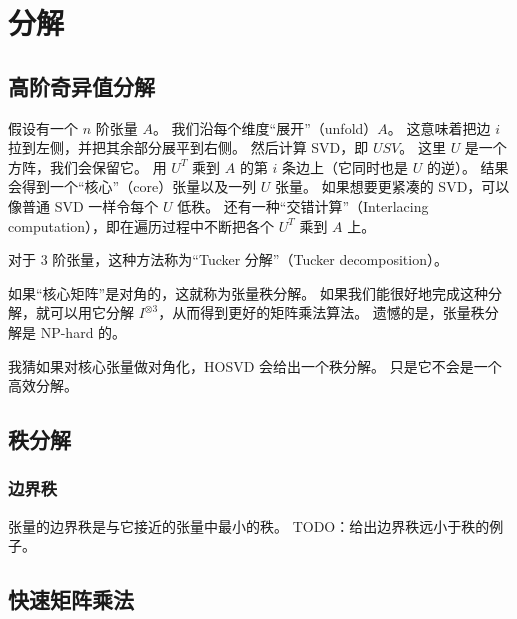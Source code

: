 
\chapter{分解}


\section{高阶奇异值分解}
\label{sec:HOSVD}
假设有一个 $n$ 阶张量 $A$。
我们沿每个维度“展开”（unfold）$A$。
这意味着把边 $i$ 拉到左侧，并把其余部分展平到右侧。
然后计算 SVD，即 $USV$。
这里 $U$ 是一个方阵，我们会保留它。
用 $U^T$ 乘到 $A$ 的第 $i$ 条边上（它同时也是 $U$ 的逆）。
结果会得到一个“核心”（core）张量以及一列 $U$ 张量。
如果想要更紧凑的 SVD，可以像普通 SVD 一样令每个 $U$ 低秩。
还有一种“交错计算”（Interlacing computation），即在遍历过程中不断把各个 $U^T$ 乘到 $A$ 上。

对于 $3$ 阶张量，这种方法称为“Tucker 分解”（Tucker decomposition）。

如果“核心矩阵”是对角的，这就称为张量秩分解。
如果我们能很好地完成这种分解，就可以用它分解 $I^{\otimes 3}$，从而得到更好的矩阵乘法算法。
遗憾的是，张量秩分解是 NP-hard 的。

我猜如果对核心张量做对角化，HOSVD 会给出一个秩分解。
只是它不会是一个高效分解。

\section{秩分解}

\subsection{边界秩}
张量的边界秩是与它接近的张量中最小的秩。
TODO：给出边界秩远小于秩的例子。

\section{快速矩阵乘法}

